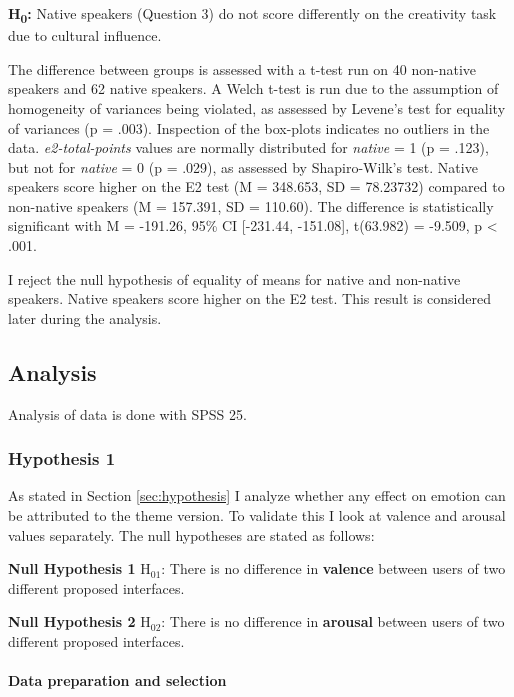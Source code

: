 		\textbf{H\textsubscript{0}:}  Native speakers (Question 3) do not score differently on the creativity task due to cultural influence. 
		
		The difference between groups is assessed with a t-test run on 40 non-native speakers and 62 native speakers. A Welch t-test is run due to the assumption of homogeneity of variances being violated, as assessed by Levene's test for equality of variances (p = .003).
		Inspection of the box-plots indicates no outliers in the data. 
		\textit{e2-total-points} values are normally distributed for \textit{native} = 1 (p = .123), but not for \textit{native} = 0 (p = .029), as assessed by Shapiro-Wilk's test. 
		Native speakers score higher on the E2 test (M = 348.653, SD = 78.23732) compared to non-native speakers (M = 157.391, SD = 110.60). The difference is statistically significant with M = -191.26, 95\% CI [-231.44, -151.08], t(63.982) = -9.509, p < .001.
		
		I reject the null hypothesis of equality of means for native and non-native speakers. Native speakers score higher on the E2 test. This result is considered later during the analysis.


	\subsection{Analysis}
	
	Analysis of data is done with SPSS 25.
	
	\subsubsection{Hypothesis 1}
	
	As stated in Section \ref{sec:hypothesis} I analyze whether any effect on emotion can be attributed to the theme version. To validate this I look at valence and arousal values separately. The null hypotheses are stated as follows:
	
	\textbf{Null Hypothesis 1} H$_{01}$: There is no difference in \textbf{valence} between users of two different proposed interfaces.
	
	\textbf{Null Hypothesis 2} H$_{02}$: There is no difference in \textbf{arousal} between users of two different proposed interfaces.
	
	\paragraph{Data preparation and selection}
	
